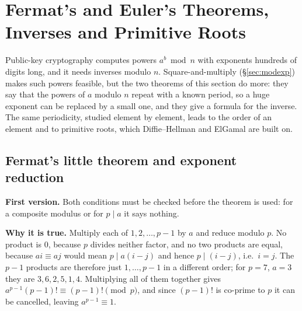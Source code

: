 \section{Fermat's and Euler's Theorems, Inverses and Primitive Roots}\label{sec:fermat}

Public-key cryptography computes powers $a^b \bmod n$ with exponents hundreds of digits long, and it needs inverses modulo $n$. Square-and-multiply (\S\ref{sec:modexp}) makes such powers feasible, but the two theorems of this section do more: they say that the powers of $a$ modulo $n$ repeat with a known period, so a huge exponent can be replaced by a small one, and they give a formula for the inverse. The same periodicity, studied element by element, leads to the order of an element and to primitive roots, which Diffie--Hellman and ElGamal are built on.

\subsection{Fermat's little theorem and exponent reduction \hot}
\textbf{First version.}  Both conditions must be checked before the theorem is used: for a composite modulus or for $p \mid a$ it says nothing.

\textbf{Why it is true.} Multiply each of $1, 2, \dots, p-1$ by $a$ and reduce modulo $p$. No product is 0, because $p$ divides neither factor, and no two products are equal, because $ai \equiv aj$ would mean $p \mid a(i - j)$ and hence $p \mid (i - j)$, i.e.\ $i = j$. The $p - 1$ products are therefore just $1, \dots, p-1$ in a different order; for $p = 7$, $a = 3$ they are $3, 6, 2, 5, 1, 4$. Multiplying all of them together gives $a^{p-1}(p-1)! \equiv (p-1)! \pmod p$, and since $(p-1)!$ is co-prime to $p$ it can be cancelled, leaving $a^{p-1} \equiv 1$.

